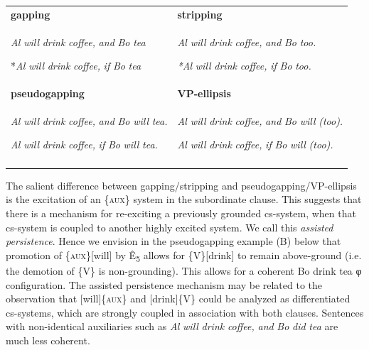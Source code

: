 \begin{tabularx}{\textwidth}{XX}
\lsptoprule
\textbf{gapping} & \textbf{stripping}\\
\textit{Al} \textit{will} \textit{drink} \textit{coffee,} \textit{and} \textit{Bo} \textit{tea}

*\textit{Al} \textit{will} \textit{drink} \textit{coffee,} \textit{if} \textit{Bo} \textit{tea} & \textit{Al} \textit{will} \textit{drink} \textit{coffee,} \textit{and} \textit{Bo} \textit{too.}

\textit{*Al} \textit{will} \textit{drink} \textit{coffee,} \textit{if} \textit{Bo} \textit{too.}  \\
\textbf{pseudogapping} & \textbf{VP-ellipsis}\\
\textit{Al} \textit{will} \textit{drink} \textit{coffee,} \textit{and} \textit{Bo} \textit{will} \textit{tea.}

\textit{Al} \textit{will} \textit{drink} \textit{coffee,} \textit{if} \textit{Bo} \textit{will} \textit{tea.} & \textit{Al} \textit{will} \textit{drink} \textit{coffee,} \textit{and} \textit{Bo} \textit{will} \textit{(too).}

\textit{Al} \textit{will} \textit{drink} \textit{coffee,} \textit{if} \textit{Bo} \textit{will} \textit{(too).}\\
\lspbottomrule
\end{tabularx}
  The salient difference between gapping/stripping and pseudogapping/VP-ellipsis is the excitation of an \{\textsc{aux}\} system in the subordinate clause. This suggests that there is a mechanism for re-exciting a previously grounded cs-system, when that cs-system is coupled to another highly excited system. We call this \textit{assisted} \textit{persistence}. Hence we envision in the pseudogapping example (B) below that promotion of \{\textsc{aux}\}[will] by Ê\textsubscript{5} allows for \{V\}[drink] to remain above-ground (i.e. the demotion of \{V\} is non-grounding). This allows for a coherent {\textbar}Bo drink tea{\textbar} φ configuration. The assisted persistence mechanism may be related to the observation that [will]\{\textsc{aux}\} and [drink]\{V\} could be analyzed as differentiated cs-systems, which are strongly coupled in association with both clauses. Sentences with non-identical auxiliaries such as \textit{Al} \textit{will} \textit{drink} \textit{coffee,} \textit{and} \textit{Bo} \textit{did} \textit{tea} are much less coherent.


